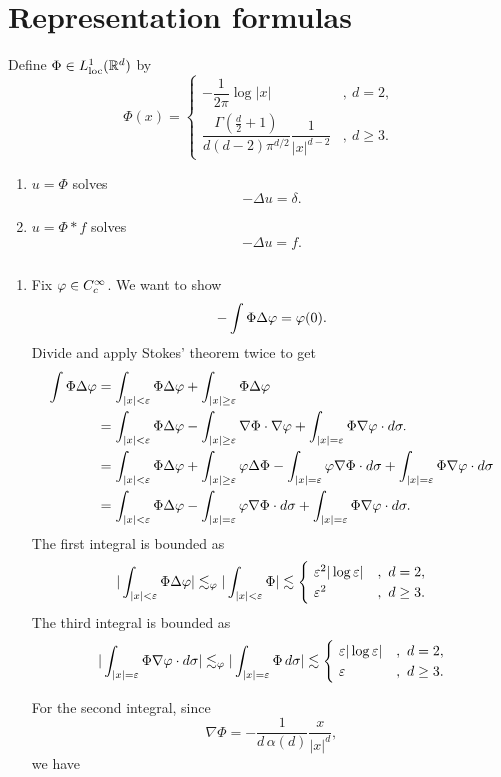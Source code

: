 \documentclass[12pt]{article}
\begin{document}
\section{Representation formulas}

\begin{thm}
Define $\Phi\in L_{\mathrm{loc}}^1(\mathbb{R}^d)$ by
\[\Phi(x)
=\begin{cases}-\dfrac1{2\pi}\log|x|&,\ d=2,\\\dfrac{\Gamma(\frac d2+1)}{d(d-2)\pi^{d/2}}\dfrac1{|x|^{d-2}}&,\ d\ge3.\end{cases}
\]
\begin{enumerate}
\item
$u=\Phi$ solves
\[-\Delta u=\delta.\]
\item
$u=\Phi*f$ solves
\[-\Delta u=f.\]
\end{enumerate}
\end{thm}
\begin{pf}$ $\\[-10pt]
\begin{enumerate}
\item
Fix $\varphi\in C_c^\infty$.
We want to show
\[-\int\Phi\Delta\varphi=\varphi(0).\]
Divide and apply Stokes' theorem twice to get
\begin{align*}
\int\Phi\Delta\varphi
&=\int_{|x|<\varepsilon}\Phi\Delta\varphi+\int_{|x|\ge\varepsilon}\Phi\Delta\varphi\\
&=\int_{|x|<\varepsilon}\Phi\Delta\varphi-\int_{|x|\ge\varepsilon}\nabla\Phi\cdot\nabla\varphi+\int_{|x|=\varepsilon}\Phi\nabla\varphi\cdot d\sigma.\\
&=\int_{|x|<\varepsilon}\Phi\Delta\varphi+\int_{|x|\ge\varepsilon}\varphi\Delta\Phi-\int_{|x|=\varepsilon}\varphi\nabla\Phi\cdot d\sigma+\int_{|x|=\varepsilon}\Phi\nabla\varphi\cdot d\sigma\\
&=\int_{|x|<\varepsilon}\Phi\Delta\varphi-\int_{|x|=\varepsilon}\varphi\nabla\Phi\cdot d\sigma+\int_{|x|=\varepsilon}\Phi\nabla\varphi\cdot d\sigma.
\end{align*}
The first integral is bounded as
\[|\int_{|x|<\e}\Phi\Delta\f|\lesssim_\f|\int_{|x|<\e}\Phi|\lesssim\begin{cases}\ \e^2|\log\e|&,\ d=2,\\\ \e^2&,\ d\ge3.\end{cases}\]
The third integral is bounded as
\[|\int_{|x|=\e}\Phi\nabla\f\cdot d\sigma|\lesssim_\f|\int_{|x|=\e}\Phi\,d\sigma|\lesssim\begin{cases}\ \e|\log\e|&,\ d=2,\\\ \e&,\ d\ge3.\end{cases}\]

For the second integral, since
\[\nabla\Phi=-\frac1{d\,\alpha(d)}\frac x{|x|^d},\]
we have
\end{enumerate}
\end{pf}
\end{document}
